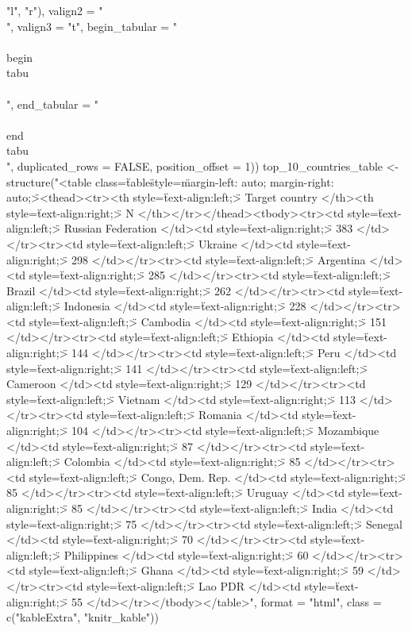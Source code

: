     "l", "r"), valign2 = "\\[t\\]", valign3 = "t", begin_tabular = "\\\\begin\\{tabu\\}\\[t\\]", 
    end_tabular = "\\\\end\\{tabu\\}", duplicated_rows = FALSE, 
    position_offset = 1))
top_10_countries_table <-
structure("<table class=\"table\" style=\"margin-left: auto; margin-right: auto;\">\n <thead>\n  <tr>\n   <th style=\"text-align:left;\"> Target country </th>\n   <th style=\"text-align:right;\"> N </th>\n  </tr>\n </thead>\n<tbody>\n  <tr>\n   <td style=\"text-align:left;\"> Russian Federation </td>\n   <td style=\"text-align:right;\"> 383 </td>\n  </tr>\n  <tr>\n   <td style=\"text-align:left;\"> Ukraine </td>\n   <td style=\"text-align:right;\"> 298 </td>\n  </tr>\n  <tr>\n   <td style=\"text-align:left;\"> Argentina </td>\n   <td style=\"text-align:right;\"> 285 </td>\n  </tr>\n  <tr>\n   <td style=\"text-align:left;\"> Brazil </td>\n   <td style=\"text-align:right;\"> 262 </td>\n  </tr>\n  <tr>\n   <td style=\"text-align:left;\"> Indonesia </td>\n   <td style=\"text-align:right;\"> 228 </td>\n  </tr>\n  <tr>\n   <td style=\"text-align:left;\"> Cambodia </td>\n   <td style=\"text-align:right;\"> 151 </td>\n  </tr>\n  <tr>\n   <td style=\"text-align:left;\"> Ethiopia </td>\n   <td style=\"text-align:right;\"> 144 </td>\n  </tr>\n  <tr>\n   <td style=\"text-align:left;\"> Peru </td>\n   <td style=\"text-align:right;\"> 141 </td>\n  </tr>\n  <tr>\n   <td style=\"text-align:left;\"> Cameroon </td>\n   <td style=\"text-align:right;\"> 129 </td>\n  </tr>\n  <tr>\n   <td style=\"text-align:left;\"> Vietnam </td>\n   <td style=\"text-align:right;\"> 113 </td>\n  </tr>\n  <tr>\n   <td style=\"text-align:left;\"> Romania </td>\n   <td style=\"text-align:right;\"> 104 </td>\n  </tr>\n  <tr>\n   <td style=\"text-align:left;\"> Mozambique </td>\n   <td style=\"text-align:right;\"> 87 </td>\n  </tr>\n  <tr>\n   <td style=\"text-align:left;\"> Colombia </td>\n   <td style=\"text-align:right;\"> 85 </td>\n  </tr>\n  <tr>\n   <td style=\"text-align:left;\"> Congo, Dem. Rep. </td>\n   <td style=\"text-align:right;\"> 85 </td>\n  </tr>\n  <tr>\n   <td style=\"text-align:left;\"> Uruguay </td>\n   <td style=\"text-align:right;\"> 85 </td>\n  </tr>\n  <tr>\n   <td style=\"text-align:left;\"> India </td>\n   <td style=\"text-align:right;\"> 75 </td>\n  </tr>\n  <tr>\n   <td style=\"text-align:left;\"> Senegal </td>\n   <td style=\"text-align:right;\"> 70 </td>\n  </tr>\n  <tr>\n   <td style=\"text-align:left;\"> Philippines </td>\n   <td style=\"text-align:right;\"> 60 </td>\n  </tr>\n  <tr>\n   <td style=\"text-align:left;\"> Ghana </td>\n   <td style=\"text-align:right;\"> 59 </td>\n  </tr>\n  <tr>\n   <td style=\"text-align:left;\"> Lao PDR </td>\n   <td style=\"text-align:right;\"> 55 </td>\n  </tr>\n</tbody>\n</table>", format = "html", class = c("kableExtra", 
"knitr_kable"))
